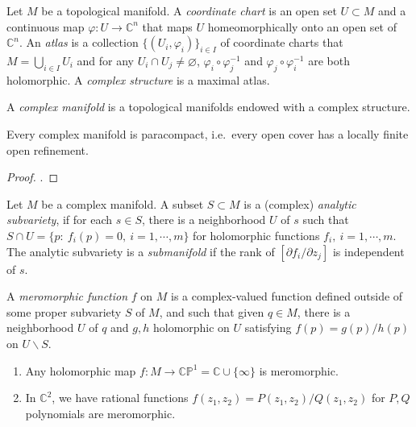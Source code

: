 \begin{defn}
    Let $M$ be a topological manifold.
    A \emph{coordinate chart} is an open set $U\subset M$ and a continuous map $\varphi:U\to\mathbb{C}^n$ that maps $U$ homeomorphically onto an open set of $\mathbb{C}^n$.
    An \emph{atlas} is a collection $\{(U_i,\varphi_i)\}_{i\in I}$ of coordinate charts that $M=\bigcup_{i\in I}U_i$ and for any $U_i\cap U_j\neq\varnothing$, $\varphi_i\circ\varphi_j^{-1}$ and $\varphi_j\circ\varphi_i^{-1}$ are both holomorphic.
    A \emph{complex structure} is a maximal atlas.

    A \emph{complex manifold} is a topological manifolds endowed with a complex structure.
\end{defn}

\begin{lem}
    Every complex manifold is paracompact, i.e.\ every open cover has a locally finite open refinement.
\end{lem}
\begin{proof}
    \cite[Theorem~4.77]{LeeTop}.
\end{proof}

\begin{defn}
    Let $M$ be a complex manifold.
    A subset $S\subset M$ is a (complex) \emph{analytic subvariety}, if for each $s\in S$, there is a neighborhood $U$ of $s$ such that $S\cap U=\{p:\ f_i(p)=0,\ i=1,\cdots,m\}$ for holomorphic functions $f_i,\ i=1,\cdots,m$.
    The analytic subvariety is a \emph{submanifold} if the rank of $[\partial f_i/\partial z_j]$ is independent of $s$.
\end{defn}

\begin{defn}
    A \emph{meromorphic function} $f$ on $M$ is a complex-valued function defined outside of some proper subvariety $S$ of $M$, and such that given $q\in M$, there is a neighborhood $U$ of $q$ and $g,h$ holomorphic on $U$ satisfying $f(p)=g(p)/h(p)$ on $U\backslash S$.
\end{defn}

\begin{eg}
    \begin{enumerate}
        \item Any holomorphic map $f:M\to\mathbb{CP}^1=\mathbb{C}\cup\{\infty\}$ is meromorphic.
        \item In $\mathbb{C}^2$, we have rational functions $f(z_1,z_2)=P(z_1,z_2)/Q(z_1,z_2)$ for $P,Q$ polynomials are meromorphic.
    \end{enumerate}
\end{eg}

